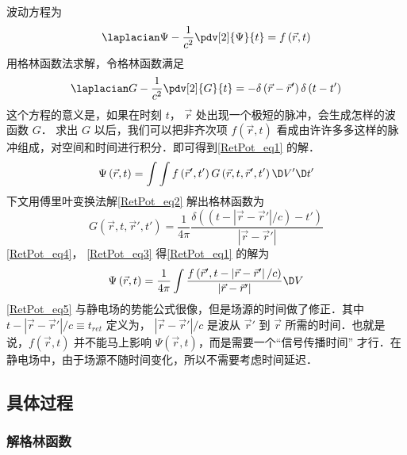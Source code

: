 
波动方程为
\begin{equation}\label{RetPot_eq1}
{\laplacian}\Psi  - \frac{1}{c^2} \pdv[2]{\Psi}{t} = f\left( {\vec r,t} \right)
\end{equation} 
用格林函数法求解，令格林函数满足
\begin{equation}\label{RetPot_eq2}
{\laplacian}G - \frac{1}{c^2} \pdv[2]{G}{t} =  - \delta \left( {\vec r - \vec r'} \right)\delta \left( {t - t'} \right)
\end{equation} 
这个方程的意义是，如果在时刻 $t$， $\vec r$ 处出现一个极短的脉冲，会生成怎样的波函数 $G$． 求出 $G$ 以后，我们可以把非齐次项 $f\left( {\vec r,t} \right)$ 看成由许许多多这样的脉冲组成，对空间和时间进行积分．即可得到\autoref{RetPot_eq1} 的解．
\begin{equation}\label{RetPot_eq3}
\Psi \left( {\vec r,t} \right) = \int {\int {f\left( {\vec r',t'} \right)G\left( {\vec r,t,\vec r',t'} \right)\D V'} \D t'} 
\end{equation} 
下文用傅里叶变换法解\autoref{RetPot_eq2} 解出格林函数为
\begin{equation}\label{RetPot_eq4}
G\left( {\vec r,t,\vec r',t'} \right) = \frac{1}{4\pi }\frac{\delta \left( {\left( {t - \left| {\vec r - \vec r'} \right|/c} \right) - t'} \right)}{\left| {\vec r - \vec r'} \right|}
\end{equation} 
\autoref{RetPot_eq4}， \autoref{RetPot_eq3} 得\autoref{RetPot_eq1} 的解为
\begin{equation}\label{RetPot_eq5}
\Psi \left( {\vec r,t} \right) = \frac{1}{4\pi }\int {\frac{f\left( {\vec r',t - \left| {\vec r - \vec r'} \right|/c} \right)}{\left| {\vec r - \vec r'} \right|}\D V} 
\end{equation} 
\autoref{RetPot_eq5} 与静电场的势能公式很像，但是场源的时间做了修正．其中 $t - \left| {\vec r - \vec r'} \right|/c \equiv {t_{ret}}$ 定义为， $\left| {\vec r - \vec r'} \right|/c$ 是波从 $\vec r'$ 到 $\vec r$ 所需的时间．也就是说，$f\left( {\vec r,t} \right)$ 并不能马上影响 $\Psi \left( {\vec r,t} \right)$，而是需要一个“信号传播时间” 才行．在静电场中，由于场源不随时间变化，所以不需要考虑时间延迟．

\subsection{具体过程}

\subsubsection{解格林函数}  


